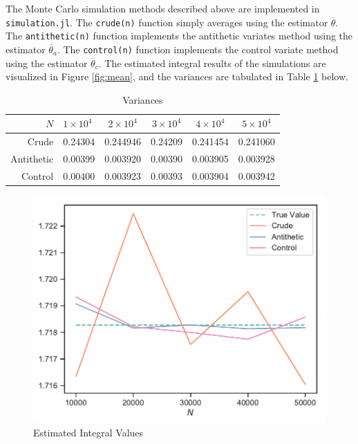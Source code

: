\documentclass[11pt, a4paper]{article}
\newcommand{\mean}[1]{\overline{#1}}
\begin{document}
\begin{enumerate}
\begin{enumerate}
                The Monte Carlo simulation methods described above are implemented in \texttt{simulation.jl}.
                The \texttt{crude(n)} function simply averages using the estimator $\mean{\theta}$.
                The \texttt{antithetic(n)} function implements the antithetic variates method using the estimator $\mean{\theta}_a$.
                The \texttt{control(n)} function implements the control variate method using the estimator $\mean{\theta}_c$.
                The estimated integral results of the simulations are visualized in Figure \ref{fig:mean},
                and the variances are tabulated in Table \ref{tab:sim} below.
                \begin{table}[H]
                    \centering
                    \caption{Variances}
                    \begin{tabular}{|r|l|c|c|c|c|} \hline
                        $N$         & $1 \times 10^4$       & $2 \times 10^4$       & $3 \times 10^4$       & $4 \times 10^4$       & $5 \times 10^4$       \\ \hline\hline
                        Crude       & 0.24304               & 0.244946              & 0.24209               & 0.241454              & 0.241060              \\ \hline
                        Antithetic  & 0.00399               & 0.003920              & 0.00390               & 0.003905              & 0.003928              \\ \hline
                        Control     & 0.00400               & 0.003923              & 0.00393               & 0.003904              & 0.003942              \\ \hline
                    \end{tabular}
                    \label{tab:sim}
                \end{table}
                \begin{figure}[H]
                   \centering
                   \caption{Estimated Integral Values}
                   \includegraphics[scale=.93]{../figures/mean.pdf}

\end{figure}
\end{enumerate}
\end{enumerate}
\end{document}
